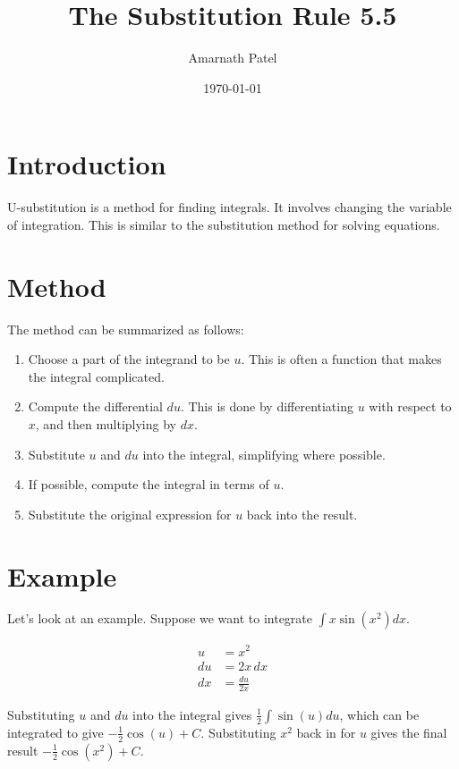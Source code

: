 \documentclass{article}
\begin{document}
\title{The Substitution Rule 5.5}
\author{Amarnath Patel}
\date{\today}

\maketitle

\section{Introduction}
U-substitution is a method for finding integrals. It involves changing the variable of integration. This is similar to the substitution method for solving equations.

\section{Method}
The method can be summarized as follows:

\begin{enumerate}
    \item Choose a part of the integrand to be $u$. This is often a function that makes the integral complicated.
    \item Compute the differential $du$. This is done by differentiating $u$ with respect to $x$, and then multiplying by $dx$.
    \item Substitute $u$ and $du$ into the integral, simplifying where possible.
    \item If possible, compute the integral in terms of $u$.
    \item Substitute the original expression for $u$ back into the result.
\end{enumerate}

\section{Example}
Let's look at an example. Suppose we want to integrate $\int x \sin(x^2) dx$.

\begin{align*}
    u &= x^2 \\
    du &= 2x \, dx \\
    dx &= \frac{du}{2x}
\end{align*}

Substituting $u$ and $du$ into the integral gives $\frac{1}{2} \int \sin(u) du$, which can be integrated to give $-\frac{1}{2} \cos(u) + C$. Substituting $x^2$ back in for $u$ gives the final result $-\frac{1}{2} \cos(x^2) + C$.
\end{document}
